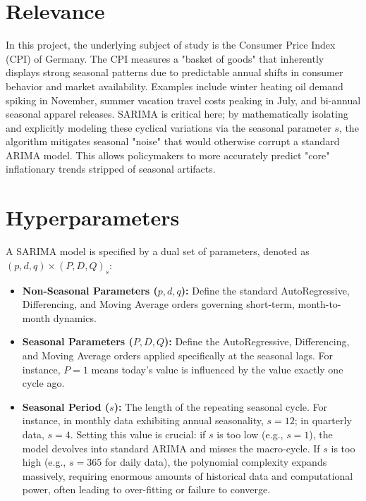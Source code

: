 \section{Relevance}
In this project, the underlying subject of study is the Consumer Price Index (CPI) of Germany. The CPI measures a "basket of goods" that inherently displays strong seasonal patterns due to predictable annual shifts in consumer behavior and market availability. Examples include winter heating oil demand spiking in November, summer vacation travel costs peaking in July, and bi-annual seasonal apparel releases. SARIMA is critical here; by mathematically isolating and explicitly modeling these cyclical variations via the seasonal parameter $s$, the algorithm mitigates seasonal "noise" that would otherwise corrupt a standard ARIMA model. This allows policymakers to more accurately predict "core" inflationary trends stripped of seasonal artifacts.

\section{Hyperparameters}
A SARIMA model is specified by a dual set of parameters, denoted as $(p, d, q) \times (P, D, Q)_s$:
\begin{itemize}
    \item \textbf{Non-Seasonal Parameters ($p, d, q$):} Define the standard AutoRegressive, Differencing, and Moving Average orders governing short-term, month-to-month dynamics.
    \item \textbf{Seasonal Parameters ($P, D, Q$):} Define the AutoRegressive, Differencing, and Moving Average orders applied specifically at the seasonal lags. For instance, $P=1$ means today's value is influenced by the value exactly one cycle ago.
    \item \textbf{Seasonal Period ($s$):} The length of the repeating seasonal cycle. For instance, in monthly data exhibiting annual seasonality, $s = 12$; in quarterly data, $s = 4$. Setting this value is crucial: if $s$ is too low (e.g., $s=1$), the model devolves into standard ARIMA and misses the macro-cycle. If $s$ is too high (e.g., $s=365$ for daily data), the polynomial complexity expands massively, requiring enormous amounts of historical data and computational power, often leading to over-fitting or failure to converge.
\end{itemize}

